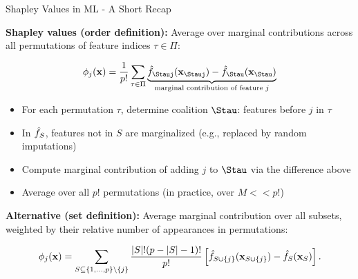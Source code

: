 \documentclass[10pt,compress,t,notes=noshow, xcolor=table]{beamer}
\begin{document}
\begin{frame}{Shapley Values in ML - A Short Recap}

% 
% 
\textbf{Shapley values (order definition):} Average over marginal contributions across all permutations of feature indices $\tau \in \Pi$:

\[
\phi_j(\xv) = \frac{1}{p!} \sum_{\tau \in \Pi} 
\underbrace{\fh_{\Stauj}(\xv_{\Stauj}) - \fh_{\Stau}(\xv_{\Stau})}_{\text{marginal contribution of feature $j$}}
\]

\begin{itemize}
  \item For each permutation $\tau$, determine coalition $\Stau$: features before $j$ in $\tau$
  \item In \(\hat{f}_S\), features not in \(S\) are marginalized (e.g., replaced by random imputations)
  \item Compute marginal contribution of adding $j$ to $\Stau$ via the difference above
  \item Average over all $p!$ permutations (in practice, over $M << p!$)
\end{itemize}

\pause\medskip

\textbf{Alternative (set definition):} Average marginal contribution over all subsets, weighted by their relative number of appearances in permutations:

\[
\phi_j(\mathbf{x}) = 
\sum_{S \subseteq \{1,\dots,p\} \setminus \{j\}} \frac{|S|!(p - |S| - 1)!}{p!} \left[\hat{f}_{S \cup \{j\}}(\mathbf{x}_{S \cup \{j\}}) - \hat{f}_S(\mathbf{x}_S)\right].
\]
% 
% 

\end{frame}
\end{document}
